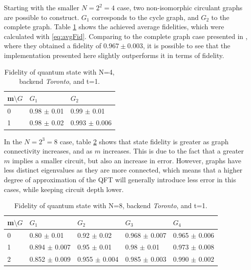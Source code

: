 \documentclass[../../dissertation.tex]{subfiles}
\begin{document}
Starting with the smaller $N = 2^2 = 4$ case, two non-isomorphic circulant graphs are possible to construct. $G_1$ corresponds to the cycle graph, and $G_2$ to the complete graph. Table \ref{tab:N2TRT} shows the achieved average fidelities, which were calculated with \eqref{eq:avgFid}. Comparing to the complete graph case presented in \cite{Qiang2016} , where they obtained a fidelity of $0.967 \pm 0.003$, it is possible to see that the implementation presented here slightly outperforms it in terms of fidelity.
\begin{table}[!h]
\centering
\begin{tabular}{| l | l | l |}
\hline
m$\setminus G$ & $G_1$               & $G_2$  \\ \hline
0   & 0.98 $\pm$ 0.01 & 0.99 $\pm$ 0.01  \\\hline
1   & 0.98 $\pm$ 0.02 & 0.993 $\pm$ 0.006   \\\hline
\end{tabular}
\caption{Fidelity of quantum state with N=4, backend \textit{Toronto}, and t=1.}
\label{tab:N2TRT}
\end{table}\par
In the $N = 2^3 = 8$ case, table \ref{tab:N3TRT} shows that state fidelity is greater as graph connectivity increases, and as $m$ increases. This is due to the fact that a greater $m$ implies a smaller circuit, but also an increase in error. However, graphs have less distinct eigenvalues as they are more connected, which means that a higher degree of approximation of the QFT will generally introduce less error in this cases, while keeping circuit depth lower.
\begin{table}[!h]
\centering
\begin{tabular}{| l | l | l | l | l |}
\hline
m$\setminus G$ & $G_1$                & $G_2$                & $G_3$                & $G_4$    \\\hline
0   & 0.80 $\pm$ 0.01 & 0.92 $\pm$ 0.02     & 0.968 $\pm$ 0.007  & 0.965 $\pm$ 0.006 \\\hline
1   & 0.894 $\pm$ 0.007 & 0.95 $\pm$ 0.01   & 0.98 $\pm$ 0.01    & 0.973 $\pm$ 0.008 \\\hline
2   & 0.852 $\pm$ 0.009 & 0.955 $\pm$ 0.004 & 0.985 $\pm$ 0.003  & 0.990 $\pm$ 0.002 \\\hline
\end{tabular}
\caption{Fidelity of quantum state with N=8, backend \textit{Toronto}, and t=1.}
\label{tab:N3TRT}
\end{table}
\end{document}
